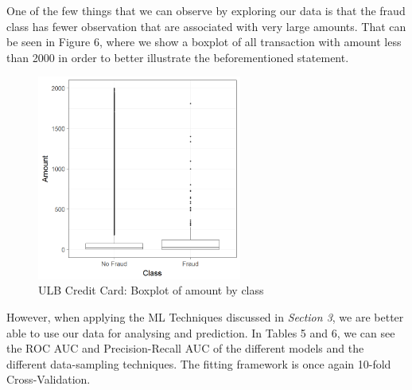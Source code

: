 \documentclass[12pt,]{article}
\begin{document}
One of the few things that we can observe by exploring our data is that
the fraud class has fewer observation that are associated with very
large amounts. That can be seen in Figure 6, where we show a boxplot of
all transaction with amount less than 2000 in order to better illustrate
the beforementioned statement.

\begin{figure}
\centering
\includegraphics[width=0.6\textwidth,height=\textheight]{figures/credit/descriptive/cr_card_fraud_amount_boxplot.png}
\caption{ULB Credit Card: Boxplot of amount by class}
\end{figure}

However, when applying the ML Techniques discussed in \emph{Section 3},
we are better able to use our data for analysing and prediction. In
Tables 5 and 6, we can see the ROC AUC and Precision-Recall AUC of the
different models and the different data-sampling techniques. The fitting
framework is once again 10-fold Cross-Validation.

\begin{table}

\caption{\label{tab:cr_card_models_AUC}ULB Credit Card: AUC Metric Model Variations}
\centering
{}
\end{table}
\end{document}
